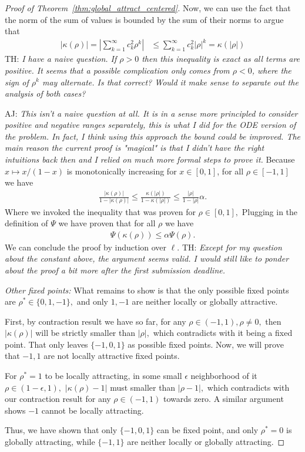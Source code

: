 \documentclass[twoside]{article}
\theoremstyle{definition}
\newcommand{\thomas}[1]{{\color{blue}TH:  \textit{#1}}}
\newcommand{\amir}[1]{{\color{cyan}AJ:  \textit{#1}}}
\begin{document}
\begin{proof}[Proof of Theorem~\ref{thm:global_attract_centered}]

 Now, we can use the fact that the norm of the sum of values is bounded by the sum of their norms to argue that 
\begin{align*}
 |\kappa(\rho)|=|\sum_{k=1}^\infty c_k^2 \rho^k | &\le \sum_{k=1}^\infty c_k^2 |\rho|^k 
 = \kappa(|\rho|)
\end{align*}
\thomas{I have a naive question. If $\rho > 0$ then this inequality is exact as all terms are positive. It seems that a possible complication only comes from $\rho<0$, where the sign of $\rho^k$ may alternate. Is that correct? Would it make sense to separate out the analysis of both cases?}

\amir{This isn't a naive question at all. It is in a sense more principled to consider positive and negative ranges separately, this is what I did for the ODE version of the problem. In fact, I think using this approach the bound could be improved. 
The main reason the current proof is "magical" is that I didn't have the right intuitions back then and I relied on much more formal steps to prove it. }
 Because $x\mapsto x/(1-x)$ is monotonically increasing for $x\in[0,1]$, for all $\rho\in[-1,1]$ we have 
    \begin{align*}
 \frac{|\kappa(\rho)|}{1-|\kappa(\rho)|}\le \frac{\kappa(|\rho|)}{1-\kappa(|\rho|)} \le \frac{|\rho|}{1-|\rho|}\alpha.
    \end{align*}
Where we invoked the inequality that was proven for $\rho\in[0,1], $ Plugging in the definition of $\Psi$ we have proven that for all $\rho$ we have
\begin{align*}
    \Psi(\kappa(\rho)) \le \alpha \Psi(\rho).
\end{align*}
We can conclude the proof by induction over $\ell.$
\thomas{Except for my question about the constant above, the argument seems valid. I would still like to ponder about the proof a bit more after the first submission deadline.}

\textit{Other fixed points:}
What remains to show is that the only possible fixed points are $\rho^* \in \{0,1,-1\},$ and only $1,-1$ are neither locally or globally attractive.  

First, by contraction result we have so far, for any $\rho \in (-1,1),\rho\neq 0,$ then $|\kappa(\rho)|$ will be strictly smaller than $|\rho|,$ which contradicts with it being a fixed point. That only leaves $\{-1,0,1\}$ as possible fixed points. Now, we will prove that $-1,1$ are not locally attractive fixed points. 

For $\rho^*=1$ to be locally attracting, in some small $\epsilon$ neighborhood of it $\rho\in(1-\epsilon,1),$ $|\kappa(\rho)-1|$ must smaller than $|\rho-1|,$ which contradicts with our contraction result for any $\rho \in (-1,1)$ towards zero. A similar argument shows $-1$ cannot be locally attracting. 

Thus, we have shown that only $\{-1,0,1\}$ can be fixed point, and only $\rho^*=0$ is globally attracting, while $\{-1,1\}$ are neither locally or globally attracting. 
\end{proof}
\end{document}
